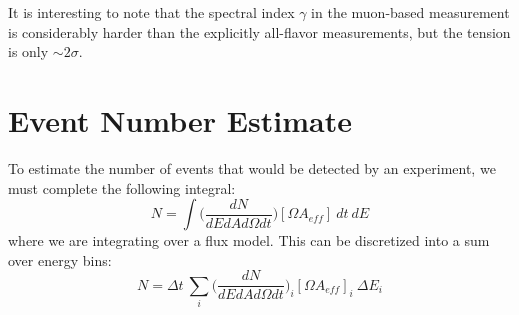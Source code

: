 \documentclass[preprint,12pt]{article}
\begin{document}
It is interesting to note that the spectral index $\gamma$ in the muon-based measurement is considerably harder than the explicitly all-flavor measurements, but the tension is only $\sim 2\sigma$.

\section{Event Number Estimate}
To estimate the number of events that would be detected by an experiment, we must complete the following integral:
\begin{equation}
N = \int \bigg( \frac{dN}{dE dA d\Omega dt} \bigg) [ \Omega A_{{eff}}] ~dt ~dE
\end{equation}
where we are integrating over a flux model. This can be discretized into a sum over energy bins:
\begin{equation}
N = \Delta t ~ \sum_i \bigg( \frac{dN}{dE dA d\Omega dt} \bigg)_i [ \Omega A_{eff}]_i ~\Delta E_i
\end{equation}






%
 
\end{document}
